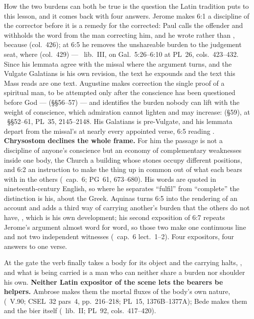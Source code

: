 How the two burdens can both be true is the question the Latin tradition puts
to this lesson, and it comes back with four answers. Jerome makes 6:1 a
discipline of the corrector before it is a remedy for the corrected: Paul
calls the offender  and withholds the word from the man correcting
him, and he wrote  rather than ,
because  (col.~426); at 6:5 he removes
the unshareable burden to the judgement seat, where  (col.~429) --- \ lib.~III, on Gal.\ 5:26--6:10 at PL~26, cols.\ 423--432. Since his lemmata agree with
the missal where the argument turns, and the Vulgate Galatians is his own
revision, the text he expounds and the text this Mass reads are one text.
Augustine makes correction the single proof of a spiritual man, to be
attempted only after the conscience has been questioned before God ---
 (§§56--57) --- and identifies the burden
nobody can lift with the weight of conscience, which admiration cannot lighten
and may increase:  (§59), at ~§§52--61,
PL~35, 2145--2148. His Galatians is pre-Vulgate, and his lemmata depart from
the missal's at nearly every appointed verse, 6:5 reading . \textbf{Chrysostom declines the whole frame.} For him the passage
is not a discipline of anyone's conscience but an economy of complementary
weaknesses inside one body, the Church a building whose stones occupy
different positions, and 6:2 an instruction to make the thing up in common out
of what each bears with in the others (\ cap.~6; PG~61,
673--680). His words are quoted in nineteenth-century English, so where he separates
``fulfil'' from ``complete'' the distinction is his, about the
Greek. Aquinas turns 6:5 into the rendering of an account and adds a third way
of carrying another's burden that the others do not have, , which is his own
development; his second exposition of 6:7 repeats Jerome's argument almost
word for word, so those two make one continuous line and not two independent
witnesses (\ cap.~6 lect.~1--2). Four expositors, four
answers to one verse.

At the gate the verb finally takes a body for its object and the carrying
halts, , and what is being carried
is a man who can neither share a burden nor shoulder his own. \textbf{Neither
Latin expositor of the scene lets the bearers be helpers.} Ambrose makes them
the mortal fluxes of the body's own nature,  (~V.90; CSEL~32 pars~4, pp.~216--218; PL~15,
1376B--1377A); Bede makes them  and the bier itself
 (\ lib.~II;
PL~92, cols.\ 417--420).

